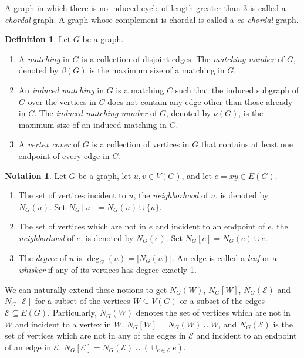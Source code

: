 \documentclass[10pt]{amsart}
\theoremstyle{definition}
\newtheorem{defi}[theo]{Definition}
\newtheorem{nota}[theo]{Notation}
\newcommand{\E}{\mathcal{E}}
\begin{document}
A graph in which there is no induced cycle of length greater than 3 is called a \emph{chordal} graph. A graph whose complement is chordal is called a \emph{co-chordal} graph.

\begin{defi} Let $G$ be a graph.
\begin{enumerate}
\item\label{def2.2_1} A \emph{matching} in $G$ is a collection of disjoint edges. The \emph{matching number} of $G$, denoted by $\beta(G)$ is the maximum size of a matching in $G$.
\item\label{def2.2_2} An \emph{induced matching} in $G$ is a matching $C$ such that the induced subgraph of $G$ over the vertices in $C$ does not contain any edge other than those already in $C$. The \emph{induced matching number} of $G$, denoted by $\nu(G)$, is the maximum size of an induced matching in $G$.
\item\label{def2.2_3} A \emph{vertex cover} of $G$ is a collection of vertices in $G$ that contains at least one endpoint of every edge in $G.$
\end{enumerate}
\end{defi}
\setcounter{theo}{5}
\begin{nota} Let $G$ be a graph, let $u,v \in V(G)$, and let $e = xy \in E(G)$.
\begin{enumerate}
\item\label{nota2.6_1} The set of vertices incident to $u$, the \emph{neighborhood} of $u$, is denoted by $N_G(u)$. Set $N_G[u] = N_G(u) \cup \{u\}$.
\item\label{nota2.6_2} The set of vertices which are not in $e$ and incident to an endpoint of $e$, the \emph{neighborhood} of $e$, is denoted by $N_G(e)$. Set $N_G[e] = N_G(e) \cup e.$
\item\label{nota2.6_3} The \emph{degree} of $u$ is $\deg_G(u) = \big|N_G(u)\big|$. An edge is called a \emph{leaf} or a \emph{whisker} if any of its vertices has degree exactly 1.
\end{enumerate}
\end{nota}

We can naturally extend these notions to get $N_G(W)$, $N_G[W]$, $N_G(\E)$ and $N_G[\E]$ for a subset of the vertices $W \subseteq V(G)$ or a subset of the edges $\E \subseteq E(G)$. Particularly, $N_G(W)$ denotes the set of vertices which are not in $W$ and incident to a vertex in $W$, $N_G[W] = N_G(W) \cup W$, and $N_G(\E)$ is the set of vertices which are not in any of the edges in $\E$ and incident to an endpoint of an edge in $\E$, $N_G[\E] = N_G(\E) \cup (\cup_{e \in \E} e)$.
\end{document}
